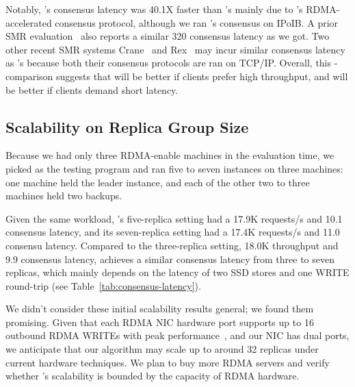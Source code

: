 Notably, \xxx's consensus latency was 40.1X faster than \zookeeper's mainly due 
to \xxx's RDMA-accelerated consensus protocol, although we ran \calvin's 
\zookeeper consensus on IPoIB. A prior SMR evaluation~\cite{dare:hpdc15} also 
reports a similar 320 \us \zookeeper consensus latency as we got. Two other 
recent SMR systems Crane~\cite{crane:sosp15} and Rex~\cite{rex:eurosys14} may 
incur similar consensus latency as \zookeeper's because both their consensus 
protocols are ran on TCP/IP. Overall, this \xxx-\calvin comparison suggests 
that \calvin will be better if clients prefer high throughput, and \xxx will be 
better if clients demand short latency.







\subsection{Scalability on Replica Group Size} \label{sec:scalability}


Because we had only three RDMA-enable machines in the evaluation time, we 
picked \redis as the testing program and ran five to seven \xxx instances on 
three machines: one machine held the leader instance, and each of the other two 
to three machines held two backups.

Given the same \redis workload, \xxx's five-replica setting had a 17.9K 
requests/s and 10.1 \us consensus latency, and its seven-replica setting had a 
17.4K requests/s and 11.0 \us consensu latency. Compared to the three-replica 
setting, 18.0K throughput and 9.9 \us consensus latency, \xxx achieves a similar 
consensus latency from three to seven replicas, which mainly depends on the 
latency of two SSD stores and one WRITE round-trip (see 
Table~\ref{tab:consensus-latency}).

We didn't consider these initial scalability results general; we found them 
promising. Given that each RDMA NIC hardware port supports up to 16 outbound 
RDMA WRITEs with peak performance~\cite{herd:sigcomm14}, and our NIC has dual 
ports, we anticipate that our algorithm may scale up to around 32 replicas 
under current hardware techniques. We plan to buy more RDMA servers and verify 
whether \xxx's scalability is bounded by the capacity of RDMA hardware.


